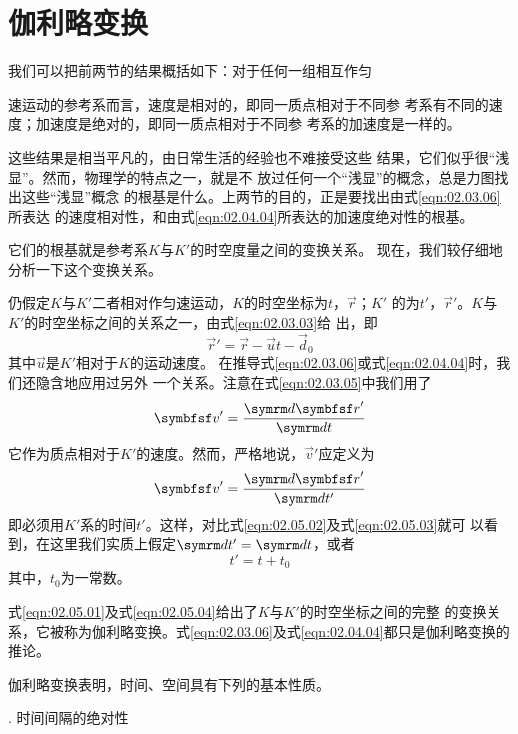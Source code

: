 \section{伽利略变换}\label{sec:02.05}

我们可以把前两节的结果概括如下：对于任何一组相互作匀

\noindent 速运动的参考系而言，速度是相对的，即同一质点相对于不同参
考系有不同的速度；加速度是绝对的，即同一质点相对于不同参
考系的加速度是一样的。

这些结果是相当平凡的，由日常生活的经验也不难接受这些
结果，它们似乎很“浅显”。然而，物理学的特点之一，就是不
放过任何一个“浅显”的概念，总是力图找出这些“浅显”概念
的根基是什么。上两节的目的，正是要找出由式\eqref{eqn:02.03.06}所表达
的速度相对性，和由式\eqref{eqn:02.04.04}所表达的加速度绝对性的根基。

它们的根基就是参考系$K$与$K'$的时空度量之间的变换关系。
现在，我们较仔细地分析一下这个变换关系。

仍假定$K$与$K'$二者相对作匀速运动，$K$的时空坐标为$t$，$\vec{r}$；$K'$
的为$t'$，$\vec{r}'$。$K$与$K'$的时空坐标之间的关系之一，由式\eqref{eqn:02.03.03}给
出，即
\begin{equation}\label{eqn:02.05.01}
  \vec{r}'=\vec{r}-\vec{u} t -\vec{d}_0
\end{equation}
其中$\vec{u}$是$K'$相对于$K$的运动速度。
在推导式\eqref{eqn:02.03.06}或式\eqref{eqn:02.04.04}时，我们还隐含地应用过另外
一个关系。注意在式\eqref{eqn:02.03.05}中我们用了
\begin{equation}\label{eqn:02.05.02}
  \vec{v}'=\frac{\dif \vec{r}'}{\dif t}
\end{equation}
它作为质点相对于$K'$的速度。然而，严格地说，$\vec{v}'$应定义为
\begin{equation}\label{eqn:02.05.03}
  \vec{v}'=\frac{\dif \vec{r}'}{\dif t'}
\end{equation}
即必须用$K'$系的时间$t'$。这样，对比式\eqref{eqn:02.05.02}及式\eqref{eqn:02.05.03}就可
以看到，在这里我们实质上假定$\dif t'=\dif t$，或者
\begin{equation}\label{eqn:02.05.04}
  t'=t+t_0
\end{equation}
其中，$t_0$为一常数。

式\eqref{eqn:02.05.01}及式\eqref{eqn:02.05.04}给出了$K$与$K'$的时空坐标之间的完整
的变换关系，它被称为伽利略变换。式\eqref{eqn:02.03.06}及式\eqref{eqn:02.04.04}都只是伽利略变换的推论。

伽利略变换表明，时间、空间具有下列的基本性质。

. 时间间隔的绝对性 \normalfont

